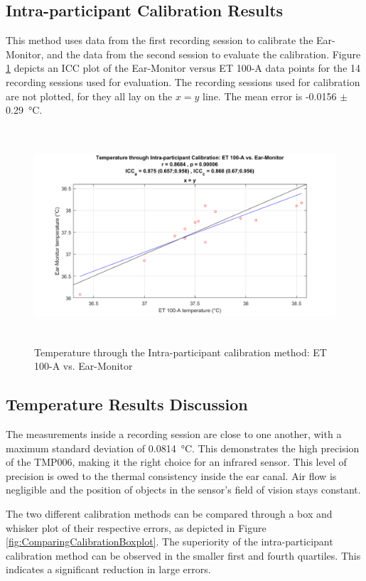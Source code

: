 \subsection{Intra-participant Calibration Results}
This method uses data from the first recording session to calibrate the Ear-Monitor, and the data from the second session to evaluate the calibration. Figure \ref{fig:Temp2Scatter} depicts an ICC plot of the Ear-Monitor versus ET 100-A data points for the 14 recording sessions used for evaluation. The recording sessions used for calibration are not plotted, for they all lay on the $x=y$ line. The mean error is -0.0156 $\pm$\SI{0.29}{\celsius}.

\begin{figure}[H]
   \centering
   \includegraphics[width=13cm,height=8cm]{figs/Temp2Scatter.png}
   \caption{Temperature through the Intra-participant calibration method: ET 100-A vs. Ear-Monitor}
   \label{fig:Temp2Scatter}
\end{figure}

\medskip

\subsection{Temperature Results Discussion}
The measurements inside a recording session are close to one another, with a maximum standard deviation of \SI{0.0814}{\celsius}. This demonstrates the high precision of the TMP006, making it the right choice for an infrared sensor. This level of precision is owed to the thermal consistency inside the ear canal. Air flow is negligible and the position of objects in the sensor's field of vision stays constant.

\medskip

The two different calibration methods can be compared through a box and whisker plot of their respective errors, as depicted in Figure \ref{fig:ComparingCalibrationBoxplot}. The superiority of the intra-participant calibration method can be observed in the smaller first and fourth quartiles. This indicates a significant reduction in large errors.

